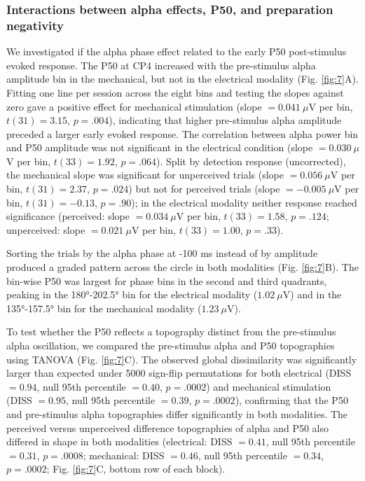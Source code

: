 \documentclass[11pt,a4paper,onecolumn]{article}
\begin{document}
\subsubsection*{Interactions between alpha effects, P50, and preparation negativity}
\vspace{-7pt}
We investigated if the alpha phase effect related to the early P50 post-stimulus evoked response. The P50 at CP4 increased with the pre-stimulus alpha amplitude bin in the mechanical, but not in the electrical modality (Fig. \ref{fig:7}A). Fitting one line per session across the eight bins and testing the slopes against zero gave a positive effect for mechanical stimulation (slope $= 0.041~\mu$V per bin, $t(31) = 3.15$, $p = .004$), indicating that higher pre-stimulus alpha amplitude preceded a larger early evoked response. The correlation between alpha power bin and P50 amplitude was not significant in the electrical condition (slope $= 0.030~\mu$V per bin, $t(33) = 1.92$, $p = .064$). Split by detection response (uncorrected), the mechanical slope was significant for unperceived trials (slope $= 0.056~\mu$V per bin, $t(31) = 2.37$, $p = .024$) but not for perceived trials (slope $= -0.005~\mu$V per bin, $t(31) = -0.13$, $p = .90$); in the electrical modality neither response reached significance (perceived: slope $= 0.034~\mu$V per bin, $t(33) = 1.58$, $p = .124$; unperceived: slope $= 0.021~\mu$V per bin, $t(33) = 1.00$, $p = .33$). 

Sorting the trials by the alpha phase at -100 ms instead of by amplitude produced a graded pattern across the circle in both modalities (Fig. \ref{fig:7}B). The bin-wise P50 was largest for phase bins in the second and third quadrants, peaking in the 180°-202.5° bin for the electrical modality ($1.02~\mu$V) and in the 135°-157.5° bin for the mechanical modality ($1.23~\mu$V).

To test whether the P50 reflects a topography distinct from the pre-stimulus alpha oscillation, we compared the pre-stimulus alpha and P50 topographies using TANOVA (Fig. \ref{fig:7}C). The observed global dissimilarity was significantly larger than expected under 5000 sign-flip permutations for both electrical (DISS $= 0.94$, null 95th percentile $= 0.40$, $p = .0002$) and mechanical stimulation (DISS $= 0.95$, null 95th percentile $= 0.39$, $p = .0002$), confirming that the P50 and pre-stimulus alpha topographies differ significantly in both modalities. The perceived versus unperceived difference topographies of alpha and P50 also differed in shape in both modalities (electrical: DISS $= 0.41$, null 95th percentile $= 0.31$, $p = .0008$; mechanical: DISS $= 0.46$, null 95th percentile $= 0.34$, $p = .0002$; Fig. \ref{fig:7}C, bottom row of each block).
\end{document}
